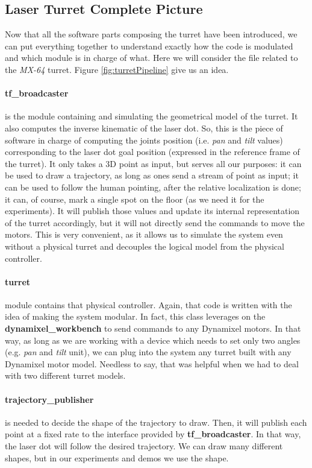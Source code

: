 \subsection{Laser Turret Complete Picture}
Now that all the software parts composing the turret have been introduced, we can put everything together to understand exactly how the code is modulated and which module is in charge of what. Here we will consider the file related to the \emph{MX-64} turret. Figure \ref{fig:turretPipeline} give us an idea.
\paragraph{tf\_broadcaster} is the module containing and simulating the geometrical model of the turret. It also computes the inverse kinematic of the laser dot. So, this is the piece of software in charge of computing the joints position (i.e. \emph{pan} and \emph{tilt} values) corresponding to the laser dot goal position (expressed in the reference frame of the turret). It only takes a 3D point as input, but serves all our purposes: it can be used to draw a trajectory, as long as ones send a stream of point as input; it can be used to follow the human pointing, after the relative localization is done; it can, of course, mark a single spot on the floor (as we need it for the experiments).
It will publish those values and update its internal representation of the turret accordingly, but it will not directly send the commands to move the motors. This is very convenient, as it allows us to simulate the system even without a physical turret and decouples the logical model from the physical controller.\\
\paragraph{turret} module contains that physical controller. Again, that code is written with the idea of making the system modular. In fact, this class leverages on the \textbf{dynamixel\_workbench} to send commands to any Dynamixel motors. In that way, as long as we are working with a device which needs to set only two angles (e.g. \emph{pan} and \emph{tilt} unit), we can plug into the system any turret built with any Dynamixel motor model. Needless to say, that was helpful when we had to deal with two different turret models.\\
\paragraph{trajectory\_publisher} is needed to decide the shape of the trajectory to draw. Then, it will publish each point at a fixed rate to the interface provided by \textbf{tf\_broadcaster}. In that way, the laser dot will follow the desired trajectory. We can draw many different shapes, but in our experiments and demos we use the \virgolette{$\infty$} shape.

